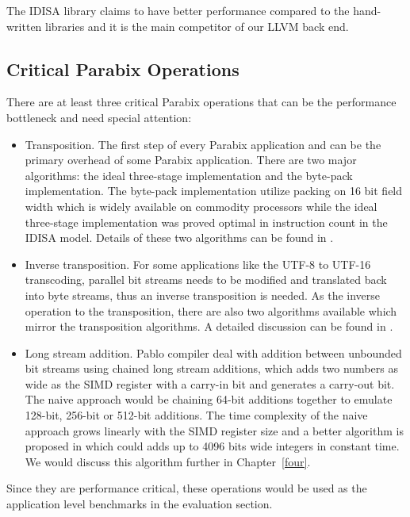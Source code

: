 The IDISA library claims to have better performance compared to the hand-written libraries and it is the main competitor of our LLVM back end.

\subsection{Critical Parabix Operations}
There are at least three critical Parabix operations that can be the performance bottleneck and need special attention:
\begin{itemize}
    \item Transposition. The first step of every Parabix application and can be the primary overhead of some Parabix application. There are two major algorithms: the ideal three-stage implementation and the byte-pack implementation. The byte-pack implementation utilize packing on 16 bit field width which is widely available on commodity processors while the ideal three-stage implementation was proved optimal in instruction count in the IDISA model. Details of these two algorithms can be found in \cite{inductive_doubling_principle}.
    \item Inverse transposition. For some applications like the UTF-8 to UTF-16 transcoding, parallel bit streams needs to be modified and translated back into byte streams, thus an inverse transposition is needed. As the inverse operation to the transposition, there are also two algorithms available which mirror the transposition algorithms. A detailed discussion can be found in \cite{rob_u8u16}.
    \item Long stream addition. Pablo compiler deal with addition between unbounded bit streams using chained long stream additions, which adds two numbers as wide as the SIMD register with a carry-in bit and generates a carry-out bit. The naive approach would be chaining 64-bit additions together to emulate 128-bit, 256-bit or 512-bit additions. The time complexity of the naive approach grows linearly with the SIMD register size and a better algorithm is proposed in \cite{rob_regex} which could adds up to 4096 bits wide integers in constant time. We would discuss this algorithm further in Chapter~\ref{four}.
\end{itemize}

Since they are performance critical, these operations would be used as the application level benchmarks in the evaluation section.


